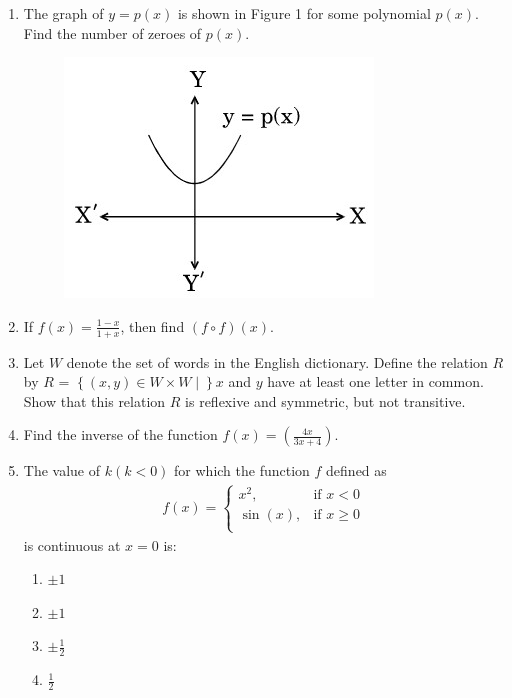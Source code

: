 \documentclass{article}
\providecommand{\cbrak}[1]{\ensuremath{\left\{#1\right\}}}
\begin{document}
\begin{enumerate}

\item The graph of $y = p(x)$ is shown in Figure 1 for some polynomial $p(x)$. Find the number of zeroes of $p(x)$.

\begin{figure}[h]
\centering
\includegraphics[width=0.4\columnwidth]{ques8.jpg}
\caption{}
\end{figure}

\item If $f(x) = \frac{1-x}{1+x}$, then find $(f\circ f)(x)$.


\item Let $W$ denote the set of words in the English dictionary. Define the relation $R$ by
$R$ = $\cbrak{(x, y) \in W \times W \mid} x$ and $y$ have at least one letter in common.
Show that this relation $R$ is reflexive and symmetric, but not transitive.
\item Find the inverse of the function $f(x) = (\frac{4x}{3x+4})$.

\item The value of $k(k < 0)$ for which the function $f$ defined as 
\begin{align*}
f(x) = \begin{cases}
x^2, & \text{if } x < 0 \\
\sin(x), & \text{if } x \geq 0  \\
\end{cases}
\end{align*}
is continuous at $x = 0$ is:

\begin{enumerate}
     \item $\pm1$ 

     \item $\pm1$ 

     \item  $\pm\frac{1}{2}$ 

     \item  $\frac{1}{2}$ 

\end{enumerate}



\end{enumerate}
\end{document}
